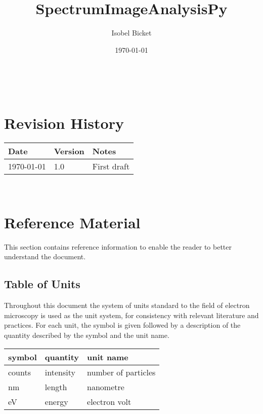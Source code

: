 \documentclass[12pt]{article}
\begin{document}

\title{SpectrumImageAnalysisPy} 
\author{Isobel Bicket}
\date{\today}
	
\maketitle

~\newpage



\section{Revision History}

\begin{tabularx}{\textwidth}{p{4cm}p{2cm}X}
	\toprule {\bf Date} & {\bf Version} & {\bf Notes}\\
	\midrule
	\today & 1.0 & First draft\\
	\bottomrule
\end{tabularx}

~\newpage

\tableofcontents

\section{Reference Material}

This section contains reference information to enable the reader to better
understand the document.

\subsection{Table of Units}

Throughout this document the system of units standard to the field of electron
microscopy is used
as the unit system, for consistency with relevant literature and practices. For
each unit, the symbol is given followed by a
description of the quantity described by the symbol and the unit name.
~\newline

\renewcommand{\arraystretch}{1.2}
  \noindent \begin{tabular}{l l l} 
    \toprule		
    \textbf{symbol} & \textbf{quantity} & \textbf{unit name}\\
    \midrule 
    counts & intensity & number of particles\\
    \si{\nano\metre} & length & nanometre\\
    \si{\electronvolt} & energy	& electron volt\\
    \bottomrule
  \end{tabular}
\end{document}
